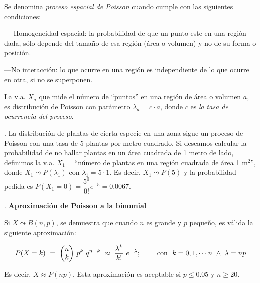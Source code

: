 \vspace{4mm}
\begin{definition}

	Se denomina \emph{proceso espacial de Poisson} cuando cumple con las siguientes condiciones:

\vspace{2mm}   --- Homogeneidad espacial: la probabilidad de que un punto este en una región dada, sólo depende del tamaño de esa región (área o volumen) y no de su forma o posición.

---No interacción: lo que ocurre en una región es independiente de lo que ocurre en otra, si no se superponen.

\vspace{2mm}  La v.a. $X_a$ que mide el número de ``puntos'' en una región de área o volumen $a$, es distribución de Poisson con parámetro $\lambda_a = c \cdot a$, donde $c$ es \emph{la tasa de ocurrencia del proceso}.

\end{definition}


\vspace{4mm}
\begin{example}
.   La distribución de plantas de cierta especie en una zona sigue un proceso de Poisson con una tasa de 5 plantas por metro cuadrado. Si deseamos calcular la probabilidad de no hallar plantas en un  área cuadrada de 1 metro de lado, definimos la v.a. $X_1 = $``número de plantas en una región cuadrada de  área 1 $\mathrm{m}^2$'', donde $X_1 \leadsto P(\lambda_1)$ con $\lambda_1 = 5 \cdot 1$. Es decir, $X_1 \leadsto P(5)$ y la probabilidad pedida es $P (X_1 = 0) = \dfrac{5^0}{0!} e^{-5} = 0.0067$.
		
\end{example}


\begin{theorem}
. \textbf{Aproximación de Poisson a la binomial}

Si $X \leadsto B(n,p)$, se demuestra que cuando $n$ es grande y $p$ pequeño, es válida la siguiente aproximación:

$$P(X=k)\  =\  \mqty(n\\k)\ p^k \ q^{n-k} \ \approx \ \dfrac{\lambda ^k}{k!} \ e^{-\lambda};\qquad \text{ con } \ k=0,1,\cdots n \ \wedge \  \lambda=np$$


\vspace{2mm} Es decir, $X \approx P (np)$. Esta aproximación es aceptable si $p \le 0.05$ y $n \ge 20$.	
\end{theorem}

